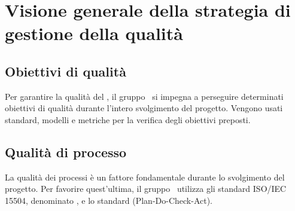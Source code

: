 \documentclass[../PianoDiQualifica.tex]{subfiles}
\begin{document}
\section{Visione generale della strategia di gestione della qualità}
	\subsection{Obiettivi di qualità}
	Per garantire la qualità del , il gruppo \kpanic\ si impegna a perseguire determinati obiettivi di qualità durante l'intero svolgimento del progetto. Vengono usati standard, modelli e metriche per la verifica degli obiettivi preposti. 
	\subsection{Qualità di processo}
	La qualità dei processi è un fattore fondamentale durante lo svolgimento del progetto. Per favorire quest'ultima, il gruppo \kpanic\ utilizza gli standard ISO/IEC 15504, denominato , e lo standard  (Plan-Do-Check-Act).
\end{document}
